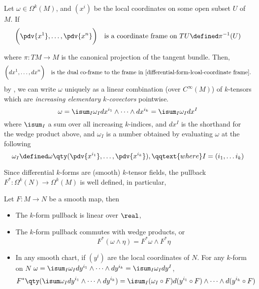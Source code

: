 \documentclass[../main-v2-manifolds.tex]{subfiles}
\begin{document}
    \begin{definition}
        Let $\omega\in\Omega^k(M)$, and $(x^i)$ be the local coordinates on some open subset $U$ of $M$. If 
        \begin{equation}\label{differential-form-lcoal-coordinate frame}
            \biggl(\pdv{x^1},\ldots,\pdv{x^n}\biggr)\quad\text{is a coordinate frame on }TU \defined \pi^{-1}(U)
        \end{equation}
            
        where $\pi: TM\to M$ is the canonical projection of the tangent bundle. Then,
        \[
            \biggl(dx^1,\ldots, dx^n\biggr)\quad\text{is the dual co-frame to the frame in  \Cref{differential-form-lcoal-coordinate frame}.}
        \]
        by , we can write $\omega$ uniquely as a linear combination (over $C^\infty(M)$) of $k$-tensors which are \emph{increasing elementary $k$-covectors} pointwise.
        \[
            \omega = \isum_I \omega_I dx^{i_1}\wedge\cdots\wedge dx^{i_k} = \isum_I \omega_Idx^{I}
        \]
        where $\isum_I$ a sum over all increasing $k$-indices, and $dx^{I}$ is the shorthand for the wedge product above, and $\omega_I$ is a number obtained by evaluating $\omega$ at the following
        \[
            \omega_I \defined \omega\qty(\pdv{x^{i_1}},\ldots, \pdv{x^{i_k}}),\qqtext{where} I = (i_1,\ldots i_k)
        \]
    \end{definition}
    Since differential $k$-forms are (smooth) $k$-tensor fields, the pullback $F^*: \Omega^k(N)\to \Omega^k(M)$ is well defined, in particular,
    \begin{wts}
           Let $F:M\to N$ be a smooth map, then
           \begin{itemize}
               \item The $k$-form pullback is linear over $\real$, 
               \item The $k$-form pullback commutes with wedge products, or 
               \[
                F^*(\omega\wedge\eta) = F^*\omega\wedge F^*\eta
               \]
               \item In any smooth chart, if $(y^i)$ are the local coordinates of $N$. For any $k$-form on $N$ $\omega = \isum_I \omega_Idy^{i_1}\wedge\cdots\wedge dy^{i_k} = \isum_I \omega_Idy^I$,
               \[
                    F^*\qty(\isum \omega_I dy^{i_1}\wedge\cdots\wedge dy^{i_k}) = \isum_I(\omega_I\circ F)d(y^{i_1}\circ F)\wedge\cdots\wedge d(y^{i_k}\circ F)
               \]
           \end{itemize}
    \end{wts}
\end{document}
